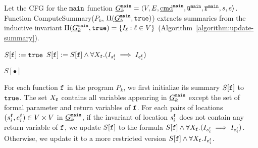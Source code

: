 Let the CFG for the $\mathtt{{main}}$ function $\underline{G}^{\mathtt{{main}}}_k = \langle V, E, \underline{\textmd{cmd}}^{\mathtt{{main}}}, \overline{\mathtt{u}}^{\mathtt{{main}}}, \overline{\mathtt{r}}^{\mathtt{{main}}},s,e \rangle$.
Function 
ComputeSummary($P_k$, $\Pi (\underline{G}^{\mathtt{{main}}}_k, \mathtt{true})$)
extracts summaries from the inductive invariant $\Pi (\underline{G}^{\mathtt{{main}}}_k, \mathtt{true})= \{ I_\ell : \ell \in V
\}$ (Algorithm~\ref{algorithm:update-summary}). 

\begin{algorithm}

  {	
  	$S[\mathtt{{f}}]:=\mathtt{true}$\;
   	{
       	{
         		$S[\mathtt{{f}}]:=S[\mathtt{{f}}]\wedge \forall X_\mathtt{f}. (I_{s_i^{\mathtt{{f}}}} \implies I_{e_i^{\mathtt{{f}}}})$\;
       	}
   	}
    
  }
 
  \Return $S[\bullet]$\;
  \caption{
  $\textmd{ComputeSummary}(P_k, \Pi (\underline{G}^{\fun{main}}_k, \TT))$}
  \label{algorithm:update-summary}
\end{algorithm}

For each function $\mathtt{{f}}$ in the program $P_k$, we first initialize its summary $S[\mathtt{{f}}]$ to $\mathtt{true}$.
The set $X_{\mathtt{{f}}}$ contains all variables appearing in $\underline{G}^{\mathtt{{main}}}_k$ except the set of formal parameter and return variables of $\mathtt{{f}}$.
For each pairs of locations $(s_i^{\mathtt{{f}}},e_i^{\mathtt{{f}}})\in V\times V$ in $\underline{G}^{\mathtt{{main}}}_k$, if the invariant of location $s_i^{\mathtt{{f}}}$ does not contain any return variable of $\mathtt{{f}}$, we update $S[\mathtt{{f}}]$ to the formula $S[\mathtt{{f}}]\wedge \forall X_{\mathtt{{f}}}. (I_{s_i^{\mathtt{{f}}}} \implies I_{e_i^{\mathtt{{f}}}})$. Otherwise, we update it to a more restricted version $S[\mathtt{{f}}]\wedge \forall X_{\mathtt{{f}}}.I_{e_i^{\mathtt{{f}}}}$.

